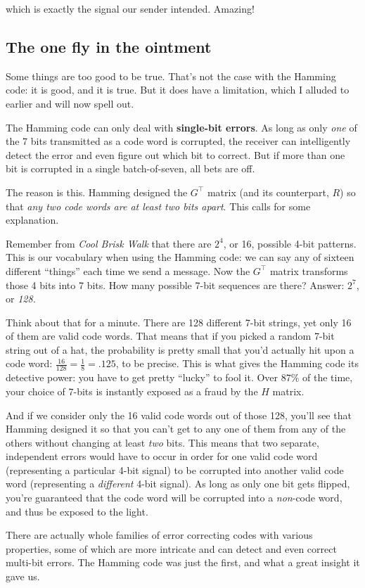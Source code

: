 which is exactly the signal our sender intended. Amazing!

\subsection{The one fly in the ointment}

Some things are too good to be true. That's not the case with the Hamming code:
it is good, and it is true. But it does have a limitation, which I alluded to
earlier and will now spell out.


The Hamming code can only deal with \textbf{single-bit errors}. As long as only
\textit{one} of the 7 bits transmitted as a code word is corrupted, the
receiver can intelligently detect the error and even figure out which bit to
correct. But if more than one bit is corrupted in a single batch-of-seven, all
bets are off.

The reason is this. Hamming designed the $G^\intercal$ matrix (and its
counterpart, $R$) so that \textit{any two code words are at least two bits
apart}. This calls for some explanation.

Remember from \textit{Cool Brisk Walk} that there are $2^{4}$, or 16, possible
4-bit patterns. This is our vocabulary when using the Hamming code: we can say
any of sixteen different ``things'' each time we send a message. Now the
$G^\intercal$ matrix transforms those 4 bits into 7 bits. How many possible
7-bit sequences are there? Answer: $2^7$, or \textit{128.}

Think about that for a minute. There are 128 different 7-bit strings, yet only
16 of them are valid code words. That means that if you picked a random 7-bit
string out of a hat, the probability is pretty small that you'd actually hit
upon a code word: $\frac{16}{128} = \frac{1}{8} = .125$, to be precise. This is
what gives the Hamming code its detective power: you have to get pretty
``lucky'' to fool it. Over $87\%$ of the time, your choice of 7-bits is
instantly exposed as a fraud by the $H$ matrix.

And if we consider only the 16 valid code words out of those 128, you'll see
that Hamming designed it so that you can't get to any one of them from any of
the others without changing at least \textit{two} bits. This means that two
separate, independent errors would have to occur in order for one valid code
word (representing a particular 4-bit signal) to be corrupted into another
valid code word (representing a \textit{different} 4-bit signal). As long as
only one bit gets flipped, you're guaranteed that the code word will be
corrupted into a \textit{non}-code word, and thus be exposed to the light.

There are actually whole families of error correcting codes with various
properties, some of which are more intricate and can detect and even correct
multi-bit errors. The Hamming code was just the first, and what a great insight
it gave us.


